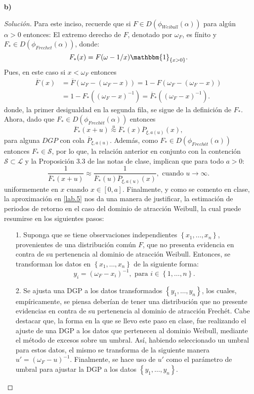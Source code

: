 \documentclass[10.5pt,notitlepage]{article}
\newenvironment{solucion}
  {\begin{proof}[Solución]}
  {\end{proof}}
\newcommand{\Ss}{\mathcal{S}}
\newcommand{\Ll}{\mathcal{L}}
\newcommand{\approxu}{\overset{u}{\approx}}
\newcommand{\kis}[1]{\left\{ #1 \right\}}
\theoremstyle{plain}
\begin{document}
\newpage
\textbf{b)}  
\begin{solucion}
Para este inciso, recuerde que si \(F \in D(\phi_{Weibull}(\alpha))\) para algún \(\alpha > 0\) entonces: El extremo derecho de \(F\), denotado por \(\omega_{F}\), es fínito y \(F_{*} \in D(\phi_{Frechet}(\alpha))\), donde:
\[
F_{*}(x) = F(\omega - 1/x)\mathbbm{1}_{\kis{x > 0}}.
\]
Pues, en este caso si \(x < \omega_{F}\) entonces
\begin{align*}
   \overline{F}(x) &= \overline{F}(\omega_{F} - (\omega_{F} - x))= 1 - F(\omega_{F} - (\omega_{F} - x))\\ 
                   &= 1 - F_{*}((\omega_{F} - x)^{-1})= \overline{F}_{*}((\omega_{F} - x)^{-1}).
\end{align*}
donde, la primer desigualdad en la segunda fila, se sigue de la definición de \(F_{*}\). Ahora, dado que \(F_{*} \in D(\phi_{Frechét}(\alpha))\) entonces 
\[
\overline{F}_{*}(x + u) \approxu \overline{F}_{*}(x)\overline{P}_{\xi, a(u)}(x),  
\]
para alguna \(DGP\) con cola \(\overline{P}_{\xi, a(u)}\). Además, como \(F_{*} \in D(\phi_{Frechét}(\alpha))\) entonces \(F_{*}\in\Ss\), por lo que, la relación anterior en conjunto con la contención \(\Ss \subset \Ll\) y la Proposición 3.3 de las notas de clase, implican que para todo \(a> 0\): 
\begin{equation}\label{lab.5}
    \frac{1}{\overline{F}_{*}(x + u)} \approx \frac{1}{\overline{F}_{*}(u)\overline{P}_{\xi, a(u)}(x)}, \text{ cuando } u \to \infty.
\end{equation}
uniformemente en \(x\) cuando \(x \in [0,a]\). Finalmente, y como se comento en clase, la aproximación en \ref{lab.5} nos da una manera de justificar, la estimación de periodos de retorno en el caso del dominio de atracción Weibull, la cual puede resumirse en los siguientes pasos: 
\begin{itemize}
    \item[1.] Suponga que se tiene observaciones independientes \(\kis{x_1, \hdots ,x_n}\), provenientes de una distribución común \(F\), que no presenta evidencia en contra de su pertenencia al dominio de atracción Weibull. Entonces, se transforman los datos en \(\kis{x_1, \hdots ,x_n}\) de la siguiente forma:
    \[
    y_i = (\omega_{F} - x_i)^{-1}, \text{ para } i \in \kis{1, \hdots, n}.
    \]
    \item[2.] Se ajusta una DGP a los datos transformados \(\kis{y_1, \hdots ,y_n}\), los cuales, empíricamente, se piensa deberían de tener una distribución que no presente evidencias en contra de su pertenencia al dominio de atracción Frechét. Cabe destacar que, la forma en la que se llevo este paso en clase, fue realizando el ajuste de una DGP a los datos que pertenecen al dominio Weibull, mediante el método de excesos sobre un umbral. Así, habiendo seleccionado un umbral para estos datos, el mismo se transforma de la siguiente manera \(u' = (\omega_{F} - u)^{-1}\). Finalmente, se hace uso de \(u'\) como el parámetro de umbral para ajustar la DGP a los datos \(\kis{y_1, \hdots ,y_n}\).

\end{itemize}
\end{solucion}
\end{document}
